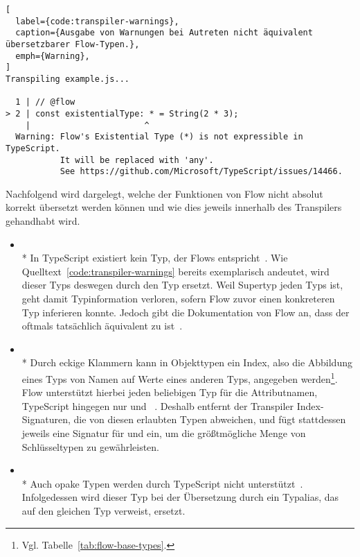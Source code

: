 \begin{lstlisting}[
  label={code:transpiler-warnings},
  caption={Ausgabe von Warnungen bei Autreten nicht äquivalent übersetzbarer Flow-Typen.},
  emph={Warning},
]
Transpiling example.js...

  1 | // @flow
> 2 | const existentialType: * = String(2 * 3);
    |                       ^
  Warning: Flow's Existential Type (*) is not expressible in TypeScript.
           It will be replaced with 'any'.
           See https://github.com/Microsoft/TypeScript/issues/14466.
\end{lstlisting}

Nachfolgend wird dargelegt, welche der Funktionen von Flow nicht absolut korrekt übersetzt werden können und wie dies jeweils innerhalb des Transpilers gehandhabt wird.

\begin{itemize}
  \item {}\\*
    In TypeScript existiert kein Typ, der Flows  entspricht~\autocite{TS:GITHUB:NO_EXISTENTIAL_TYPE}. Wie Quelltext~\ref{code:transpiler-warnings} bereits exemplarisch andeutet, wird dieser Typs deswegen durch den Typ  ersetzt. Weil  Supertyp jeden Typs ist, geht damit Typinformation verloren, sofern Flow zuvor einen konkreteren Typ inferieren konnte. Jedoch gibt die Dokumentation von Flow an, dass der  oftmals tatsächlich äquivalent zu  ist~\autocite{FLOW:LINT_RULE_REFERENCE}.
  \medbreak
  \item {}\\*
    Durch eckige Klammern kann in Objekttypen ein Index, also die Abbildung eines Typs von Namen auf Werte eines anderen Typs, angegeben werden\footnote{Vgl. Tabelle~\ref{tab:flow-base-types}.}. Flow unterstützt hierbei jeden beliebigen Typ für die Attributnamen, TypeScript hingegen nur  und ~\autocite{TS:HANDBOOK:INTERFACES}. Deshalb entfernt der Transpiler Index-Signaturen, die von diesen erlaubten Typen abweichen, und fügt stattdessen jeweils eine Signatur für  und  ein, um die größtmögliche Menge von Schlüsseltypen zu gewährleisten.
  \medbreak
  \item {}\\*
    Auch opake Typen werden durch TypeScript nicht unterstützt~\autocite{TS:GITHUB:NO_OPAQUE_TYPE}. Infolgedessen wird dieser Typ bei der Übersetzung durch ein Typalias, das auf den gleichen Typ verweist, ersetzt.

\end{itemize}
